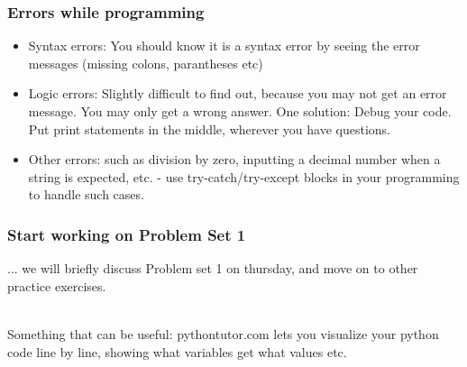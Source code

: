 \documentclass{beamer}
\begin{document}
\begin{frame}
\frametitle{Errors while programming}
\begin{itemize}
\item Syntax errors: You should know it is a syntax error by seeing the error messages (missing colons, parantheses etc)
\pause \item Logic errors: Slightly difficult to find out, because you may not get an error message. You may only get a wrong answer. One solution: Debug your code. Put print statements in the middle, wherever you have questions.
\pause \item Other errors: such as division by zero, inputting a decimal number when a string is expected, etc. - use try-catch/try-except blocks in your programming to handle such cases.
\end{itemize}
\end{frame}

\begin{frame}[fragile]
\frametitle{Start working on Problem Set 1}
... we will briefly discuss Problem set 1 on thursday, and move on to other practice exercises. 

\\ Something that can be useful: pythontutor.com lets you visualize your python code line by line, showing what variables get what values etc. 
\end{frame}
\end{document}
